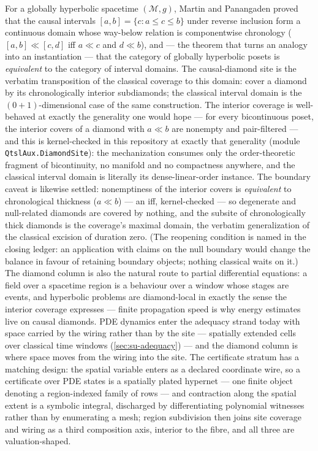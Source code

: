 For a
globally hyperbolic spacetime $(\mathcal{M}, g)$,
Martin and Panangaden \cite{martin04}
proved that the causal intervals $[a,b] = \{c : a \le c \le b\}$
under reverse inclusion form a continuous domain whose way-below
relation is componentwise chronology ($[a,b] \ll [c,d]$ iff
$a \ll c$ and $d \ll b$), and --- the theorem that turns an analogy
into an instantiation --- that the category of globally hyperbolic
posets is \emph{equivalent} to the category of interval domains. The
causal-diamond site is the verbatim transposition of the classical
coverage to this domain: cover a diamond by its chronologically
interior subdiamonds; the classical interval domain is the
$(0{+}1)$-dimensional case of the same construction. The interior
coverage is well-behaved at exactly the generality one would hope ---
for every bicontinuous poset, the interior covers of a diamond with
$a \ll b$ are nonempty and pair-filtered --- and this is
kernel-checked in this repository at exactly that generality (module
\texttt{QtslAux.DiamondSite}): the mechanization consumes only the
order-theoretic fragment of bicontinuity, no manifold and no
compactness anywhere, and the classical interval domain is literally
its dense-linear-order instance. The boundary
caveat is likewise settled: nonemptiness of the interior covers is
\emph{equivalent} to chronological thickness ($a \ll b$) --- an
iff, kernel-checked ---
so degenerate and null-related diamonds are covered by nothing, and
the subsite of chronologically thick diamonds is the coverage's
maximal domain, the verbatim generalization of the classical
excision of duration zero. (The reopening condition is named in the
closing ledger: an application with claims on the null boundary would
change the balance in favour of retaining boundary objects; nothing
classical waits on it.) The diamond column is also the natural route
to partial differential equations: a field over a spacetime region
is a behaviour over a window whose stages are events, and hyperbolic
problems are diamond-local in exactly the sense the interior
coverage expresses --- finite propagation speed is why energy
estimates live on causal diamonds. PDE dynamics enter the adequacy
strand today with space carried by the wiring rather than by the
site --- spatially extended cells over classical time windows
(\autoref{sec:su-adequacy}) --- and the diamond column is where
space moves from the wiring into the site. The certificate stratum
has a matching design: the spatial variable enters as a declared
coordinate wire, so a certificate over PDE states is a spatially
plated hypernet --- one finite object denoting a region-indexed
family of rows --- and contraction along the spatial extent is a
symbolic integral, discharged by differentiating polynomial
witnesses rather than by enumerating a mesh; region subdivision
then joins site coverage and wiring as a third composition axis,
interior to the fibre, and all three are valuation-shaped.

